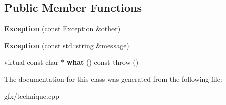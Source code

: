 \subsection*{Public Member Functions}
\begin{DoxyCompactItemize}
\item 
{\bfseries Exception} (const \hyperlink{class____impl_1_1Exception}{Exception} \&other)\hypertarget{class____impl_1_1Exception_a754eddf2855314a176870f2d643e53dd}{}\label{class____impl_1_1Exception_a754eddf2855314a176870f2d643e53dd}

\item 
{\bfseries Exception} (const std\+::string \&message)\hypertarget{class____impl_1_1Exception_a72bd83b3e6f85b553396ab335e9ab5de}{}\label{class____impl_1_1Exception_a72bd83b3e6f85b553396ab335e9ab5de}

\item 
virtual const char $\ast$ {\bfseries what} () const   throw ()\hypertarget{class____impl_1_1Exception_ae2f50ed80cebffb9e3060cc6b036481e}{}\label{class____impl_1_1Exception_ae2f50ed80cebffb9e3060cc6b036481e}

\end{DoxyCompactItemize}


The documentation for this class was generated from the following file\+:\begin{DoxyCompactItemize}
\item 
gfx/technique.\+cpp\end{DoxyCompactItemize}
